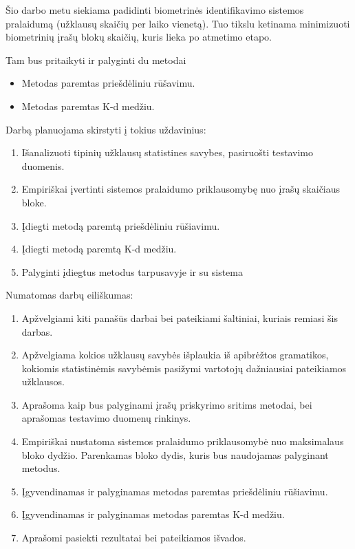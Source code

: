 Šio darbo metu siekiama padidinti biometrinės identifikavimo sistemos \cite{NeurotechnologyMegamatcherAccelerator} pralaidumą (užklausų skaičių per laiko vienetą).
Tuo tikslu ketinama minimizuoti biometrinių įrašų blokų skaičių, kuris lieka po atmetimo etapo.

Tam bus pritaikyti ir palyginti du metodai
\begin{itemize}
		\item Metodas paremtas priešdėliniu rūšavimu.
		\item Metodas paremtas K-d medžiu.
\end{itemize}

Darbą planuojama skirstyti į tokius uždavinius:

\begin{enumerate}
	\item Išanalizuoti tipinių užklausų statistines savybes, pasiruošti testavimo duomenis.
	\item Empiriškai įvertinti sistemos pralaidumo priklausomybę nuo įrašų skaičiaus bloke.
	\item Įdiegti metodą paremtą priešdėliniu rūšiavimu.
	\item Įdiegti metodą paremtą K-d medžiu.
	\item Palyginti įdiegtus metodus tarpusavyje ir su sistema \cite{NeurotechnologyMegamatcherAccelerator}
\end{enumerate}

Numatomas darbų eiliškumas:
\begin{enumerate}
	\item Apžvelgiami kiti panašūs darbai bei pateikiami šaltiniai, kuriais remiasi šis darbas.
	\item Apžvelgiama kokios užklausų savybės išplaukia iš apibrėžtos gramatikos, kokiomis statistinėmis savybėmis pasižymi vartotojų dažniausiai pateikiamos užklausos.
	\item Aprašoma kaip bus palyginami įrašų priskyrimo sritims metodai, bei aprašomas testavimo duomenų rinkinys.
	\item Empiriškai nustatoma sistemos pralaidumo priklausomybė nuo maksimalaus bloko dydžio. Parenkamas bloko dydis, kuris bus naudojamas palyginant metodus.
	\item Įgyvendinamas ir palyginamas metodas paremtas priešdėliniu rūšiavimu.
	\item Įgyvendinamas ir palyginamas metodas paremtas K-d medžiu.
	\item Aprašomi pasiekti rezultatai bei pateikiamos išvados.
\end{enumerate}


